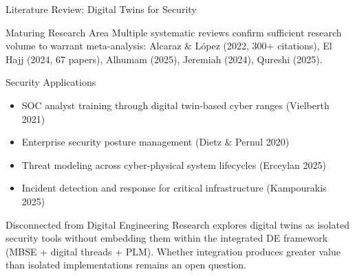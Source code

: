 \documentclass{beamer}
\begin{document}
\begin{frame}[allowframebreaks]{Literature Review: Digital Twins for Security}
  \begin{block}{Maturing Research Area}
    Multiple systematic reviews confirm sufficient research volume to warrant meta-analysis: Alcaraz \& L\'{o}pez (2022, 300+ citations), El Hajj (2024, 67 papers), Alhumam (2025), Jeremiah (2024), Qureshi (2025).
  \end{block}

  \begin{block}{Security Applications}
    \begin{itemize}
      \item SOC analyst training through digital twin-based cyber ranges (Vielberth 2021)
      \item Enterprise security posture management (Dietz \& Pernul 2020)
      \item Threat modeling across cyber-physical system lifecycles (Erceylan 2025)
      \item Incident detection and response for critical infrastructure (Kampourakis 2025)
    \end{itemize}
  \end{block}

  \begin{block}{Disconnected from Digital Engineering}
    Research explores digital twins as isolated security tools without embedding them within the integrated DE framework (MBSE + digital threads + PLM). Whether integration produces greater value than isolated implementations remains an open question.
  \end{block}
\end{frame}
\end{document}
